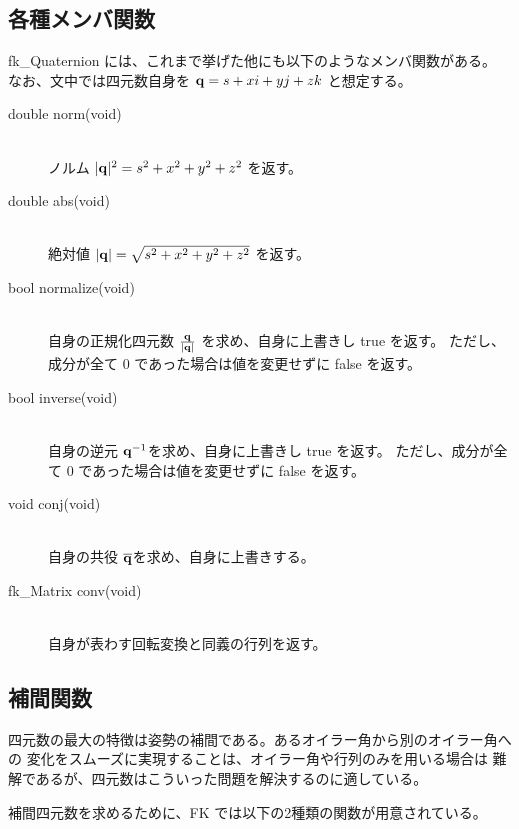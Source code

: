 \subsection{各種メンバ関数}
fk\_Quaternion には、これまで挙げた他にも以下のようなメンバ関数がある。
なお、文中では四元数自身を \(\mathbf{q} = s + xi + yj + zk\) と想定する。

\begin{description}
\item[double norm(void)] ~ \\
ノルム \(|\mathbf{q}|^2 = s^2 + x^2 + y^2 + z^2\) を返す。\\

\item[double abs(void)] ~ \\
絶対値 \(|\mathbf{q}| = \sqrt{s^2 + x^2 + y^2 + z^2}\) を返す。\\

\item[bool normalize(void)] ~ \\
自身の正規化四元数 \(\frac{\mathbf{q}}{|\mathbf{q}|}\) を求め、自身に上書きし true を返す。
ただし、成分が全て 0 であった場合は値を変更せずに false を返す。\\

\item[bool inverse(void)] ~ \\
自身の逆元 \(\mathbf{q}^{-1}\)を求め、自身に上書きし true を返す。
ただし、成分が全て 0 であった場合は値を変更せずに false を返す。\\

\item[void conj(void)] ~ \\
自身の共役 \(\overline{\mathbf{q}}\)を求め、自身に上書きする。\\

\item[fk\_Matrix conv(void)] ~ \\
自身が表わす回転変換と同義の行列を返す。
\end{description}

\subsection{補間関数}
四元数の最大の特徴は姿勢の補間である。あるオイラー角から別のオイラー角への
変化をスムーズに実現することは、オイラー角や行列のみを用いる場合は
難解であるが、四元数はこういった問題を解決するのに適している。

補間四元数を求めるために、FK では以下の2種類の関数が用意されている。

